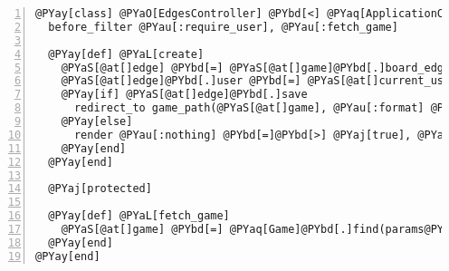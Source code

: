 \begin{Verbatim}[commandchars=@\[\],numbers=left,firstnumber=1,stepnumber=1]
@PYay[class] @PYaO[EdgesController] @PYbd[<] @PYaq[ApplicationController]
  before_filter @PYau[:require_user], @PYau[:fetch_game]

  @PYay[def] @PYaL[create]
    @PYaS[@at[]edge] @PYbd[=] @PYaS[@at[]game]@PYbd[.]board_edges@PYbd[.]build(params@PYbd[@lb[]]@PYau[:edge]@PYbd[@rb[]])
    @PYaS[@at[]edge]@PYbd[.]user @PYbd[=] @PYaS[@at[]current_user]
    @PYay[if] @PYaS[@at[]edge]@PYbd[.]save
      redirect_to game_path(@PYaS[@at[]game], @PYau[:format] @PYbd[=]@PYbd[>] @PYau[:json])
    @PYay[else]
      render @PYau[:nothing] @PYbd[=]@PYbd[>] @PYaj[true], @PYau[:status] @PYbd[=]@PYbd[>] @PYau[:unprocessable_entity]
    @PYay[end]
  @PYay[end]

  @PYaj[protected]

  @PYay[def] @PYaL[fetch_game]
    @PYaS[@at[]game] @PYbd[=] @PYaq[Game]@PYbd[.]find(params@PYbd[@lb[]]@PYau[:game_id]@PYbd[@rb[]])
  @PYay[end]
@PYay[end]
\end{Verbatim}

